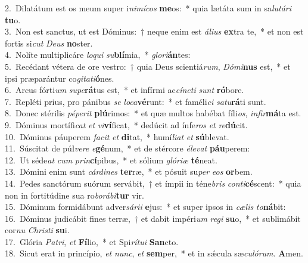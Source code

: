 {2.~}Dilatátum est os meum super i\textit{ni}\textit{mí}\textit{cos} \textbf{me}os:~* quia lætáta sum in sa\textit{lu}\textit{tá}\textit{ri} \textbf{tu}o.\\
{3.~}Non est sanctus, ut est Dóminus:~† neque enim est \textit{á}\textit{li}\textit{us} \textbf{ex}tra te,~* et non est fortis si\textit{cut} \textit{De}\textit{us} \textbf{no}ster.\\
{4.~}Nolíte multiplicáre \textit{lo}\textit{qui} \textit{su}\textbf{blí}mia,~* \textit{glo}\textit{ri}\textbf{án}tes:\\
{5.~}Recédant vétera de ore vestro:~† quia Deus scientiá\textit{rum}, \textit{Dó}\textit{mi}\textbf{nus} est,~* et ipsi præparántur co\textit{gi}\textit{ta}\textit{ti}\textbf{ó}nes.\\
{6.~}Arcus fórti\textit{um} \textit{su}\textit{pe}\textbf{rá}tus est,~* et infírmi ac\textit{cín}\textit{cti} \textit{sunt} \textbf{ró}bore.\\
{7.~}Repléti prius, pro pánibus \textit{se} \textit{lo}\textit{ca}\textbf{vé}runt:~* et faméli\textit{ci} \textit{sa}\textit{tu}\textbf{rá}ti sunt.\\
{8.~}Donec stérilis \textit{pé}\textit{pe}\textit{rit} \textbf{plú}rimos:~* et quæ multos habébat fíli\textit{os}, \textit{in}\textit{fir}\textbf{má}ta est.\\
{9.~}Dóminus mortífi\textit{cat} \textit{et} \textit{vi}\textbf{ví}ficat,~* dedúcit ad ínfe\textit{ros} \textit{et} \textit{re}\textbf{dú}cit.\\
{10.~}Dóminus páuperem \textit{fa}\textit{cit} \textit{et} \textbf{di}tat,~* humí\textit{li}\textit{at} \textit{et} \textbf{sú}blevat.\\
{11.~}Súscitat de púl\textit{ve}\textit{re} \textit{e}\textbf{gé}num,~* et de stércore \textit{é}\textit{le}\textit{vat} \textbf{páu}perem:\\
{12.~}Ut séde\textit{at} \textit{cum} \textit{prin}\textbf{cí}pibus,~* et sólium \textit{gló}\textit{ri}\textit{æ} \textbf{té}neat.\\
{13.~}Dómini enim sunt \textit{cár}\textit{di}\textit{nes} \textbf{ter}ræ,~* et pósuit su\textit{per} \textit{e}\textit{os} \textbf{or}bem.\\
{14.~}Pedes sanctórum suórum servábit,~† et ímpii in téne\textit{bris} \textit{con}\textit{ti}\textbf{cé}scent:~* quia non in fortitúdine sua ro\textit{bo}\textit{rá}\textit{bi}\textbf{tur} vir.\\
{15.~}Dóminum formidábunt adver\textit{sá}\textit{ri}\textit{i} \textbf{e}jus:~* et super ipsos in \textit{cæ}\textit{lis} \textit{to}\textbf{ná}bit:\\
{16.~}Dóminus judicábit fines terræ,~† et dabit impéri\textit{um} \textit{re}\textit{gi} \textbf{su}o,~* et sublimábit cor\textit{nu} \textit{Chri}\textit{sti} \textbf{su}i.\\
{17.~}Glória \textit{Pa}\textit{tri}, \textit{et} \textbf{Fí}lio,~* et Spi\textit{rí}\textit{tu}\textit{i} \textbf{San}cto.\\
{18.~}Sicut erat in princípio, \textit{et} \textit{nunc}, \textit{et} \textbf{sem}per,~* et in sǽcula sæ\textit{cu}\textit{ló}\textit{rum}. \textbf{A}men.\\
